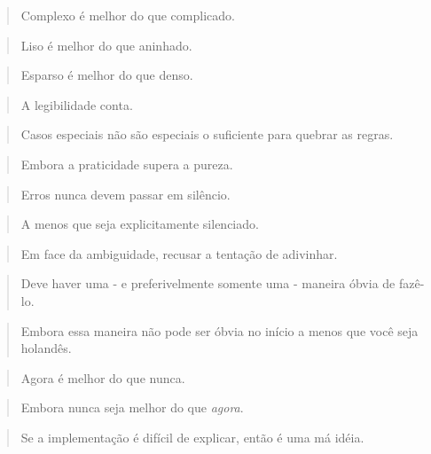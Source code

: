 \documentclass[11pt]{article}
\begin{document}
\begin{quote}
Complexo é melhor do que complicado.
\end{quote}

\begin{quote}
Liso é melhor do que aninhado.
\end{quote}

\begin{quote}
Esparso é melhor do que denso.
\end{quote}

\begin{quote}
A legibilidade conta.
\end{quote}

\begin{quote}
Casos especiais não são especiais o suficiente para quebrar as regras.
\end{quote}

\begin{quote}
Embora a praticidade supera a pureza.
\end{quote}

\begin{quote}
Erros nunca devem passar em silêncio.
\end{quote}

\begin{quote}
A menos que seja explicitamente silenciado.
\end{quote}

\begin{quote}
Em face da ambiguidade, recusar a tentação de adivinhar.
\end{quote}

\begin{quote}
Deve haver uma - e preferivelmente somente uma - maneira óbvia de
fazê-lo.
\end{quote}

\begin{quote}
Embora essa maneira não pode ser óbvia no início a menos que você seja
holandês.
\end{quote}

\begin{quote}
Agora é melhor do que nunca.
\end{quote}

\begin{quote}
Embora nunca seja melhor do que \emph{agora}.
\end{quote}

\begin{quote}
Se a implementação é difícil de explicar, então é uma má idéia.
\end{quote}
\end{document}
